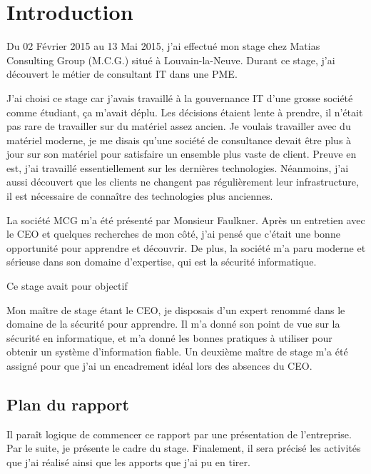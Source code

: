 \chapter*{Introduction}
Du 02 Février 2015 au 13 Mai 2015, j'ai effectué mon stage chez Matias Consulting Group (M.C.G.) situé à Louvain-la-Neuve.
Durant ce stage, j'ai découvert le métier de consultant IT dans une PME.

J'ai choisi ce stage car j'avais travaillé à la gouvernance IT d'une grosse société comme étudiant, ça m'avait déplu. 
Les décisions étaient lente à prendre, il n'était pas rare de travailler sur du matériel assez ancien.
Je voulais travailler avec du matériel moderne, je me disais qu'une société de consultance devait être plus à jour sur son matériel pour satisfaire un ensemble plus vaste de client.
Preuve en est, j'ai travaillé essentiellement sur les dernières technologies.
Néanmoins, j'ai aussi découvert que les clients ne changent pas régulièrement leur infrastructure, il est nécessaire de connaître des technologies plus anciennes. 

La société MCG m'a été présenté par Monsieur Faulkner.
Après un entretien avec le CEO et quelques recherches de mon côté, j'ai pensé que c'était une bonne opportunité pour apprendre et découvrir. 
De plus, la société m'a paru moderne et sérieuse dans son domaine d'expertise, qui est la sécurité informatique.

Ce stage avait pour objectif 


Mon maître de stage étant le CEO, je disposais d'un expert renommé dans le domaine de la sécurité pour apprendre.
Il m'a donné son point de vue sur la sécurité en informatique, et m'a donné les bonnes pratiques à utiliser pour obtenir un système d'information fiable.
Un deuxième maître de stage m'a été assigné pour que j'ai un encadrement idéal lors des absences du CEO. 

\section*{Plan du rapport}
Il paraît logique de commencer ce rapport par une présentation de l'entreprise.
Par le suite, je présente le cadre du stage.
Finalement, il sera précisé les activités que j'ai réalisé ainsi que les apports que j'ai pu en tirer. 